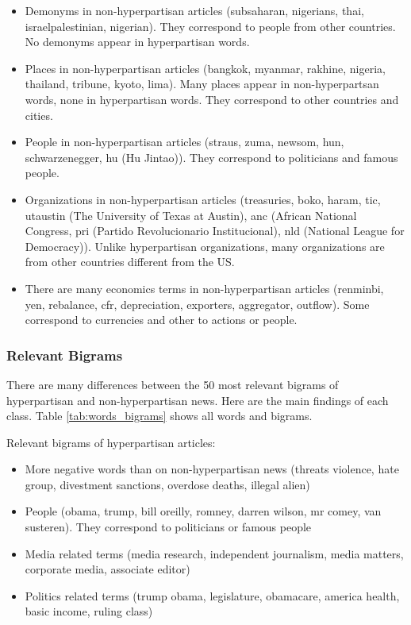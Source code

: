 \documentclass[11pt,a4paper]{article}
\begin{document}
\begin{itemize}
\item
  Demonyms in non-hyperpartisan articles (subsaharan, nigerians, thai,
  israelpalestinian, nigerian). They correspond to people from other
  countries. No demonyms appear in hyperpartisan words.
\item
  Places in non-hyperpartisan articles (bangkok, myanmar, rakhine,
  nigeria, thailand, tribune, kyoto, lima). Many places appear in
  non-hyperpartsan words, none in hyperpartisan words. They correspond
  to other countries and cities.
\item
  People in non-hyperpartisan articles (straus, zuma, newsom, hun,
  schwarzenegger, hu (Hu Jintao)). They correspond to politicians and
  famous people.
\item
  Organizations in non-hyperpartisan articles (treasuries, boko, haram,
  tic, utaustin (The University of Texas at Austin), anc (African
  National Congress, pri (Partido Revolucionario Institucional), nld
  (National League for Democracy)). Unlike hyperpartisan organizations,
  many organizations are from other countries different from the US.
\item
  There are many economics terms in non-hyperpartisan articles
  (renminbi, yen, rebalance, cfr, depreciation, exporters, aggregator,
  outflow). Some correspond to currencies and other to actions or
  people.
\end{itemize}

\subsubsection{Relevant Bigrams}

There are many differences between the 50 most relevant bigrams of
hyperpartisan and non-hyperpartisan news. Here are the main findings of each class. Table \ref{tab:words_bigrams} shows all words and bigrams.

Relevant bigrams of hyperpartisan articles:

\begin{itemize}
\item
  More negative words than on non-hyperpartisan news (threats violence,
  hate group, divestment sanctions, overdose deaths, illegal alien)
\item
  People (obama, trump, bill oreilly, romney, darren wilson, mr comey,
  van susteren). They correspond to politicians or famous people
\item
  Media related terms (media research, independent journalism, media
  matters, corporate media, associate editor)
\item
  Politics related terms (trump obama, legislature, obamacare, america
  health, basic income, ruling class)
\end{itemize}
\end{document}
